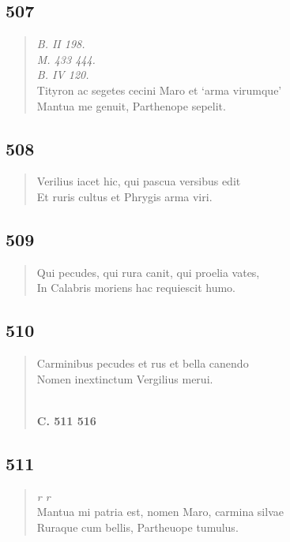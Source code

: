 \documentclass[11pt, a4paper]{report}
\begin{document}
            \subsection*{507}
      \begin{verse}
      \textit{B. II 198.} \\ \textit{M. 433 444.} \\ \textit{B. IV 120.} \\ Tityron ac segetes cecini Maro et ‘arma virumque’ \\ Mantua me genuit, Parthenope sepelit. \\ 
      \end{verse}
  
            \subsection*{508}
      \begin{verse}
      Verilius iacet hic, qui pascua versibus edit \\ Et ruris cultus et Phrygis arma viri. \\ 
      \end{verse}
  
            \subsection*{509}
      \begin{verse}
      Qui pecudes, qui rura canit, qui proelia vates, \\ In Calabris moriens hac requiescit humo. \\ 
      \end{verse}
  
            \subsection*{510}
      \begin{verse}
      Carminibus pecudes et rus et bella canendo \\ Nomen inextinctum Vergilius merui. \\ 
        ﻿\pagebreak 
    \begin{center} \textbf{C. 511 516} \end{center} \marginpar{[63]} 
      \end{verse}
  
            \subsection*{511}
      \begin{verse}
      \textit{r r} \\ Mantua mi patria est, nomen Maro, carmina silvae \\ Ruraque cum bellis, Partheuope tumulus. \\ 
      \end{verse}
  
\end{document}

